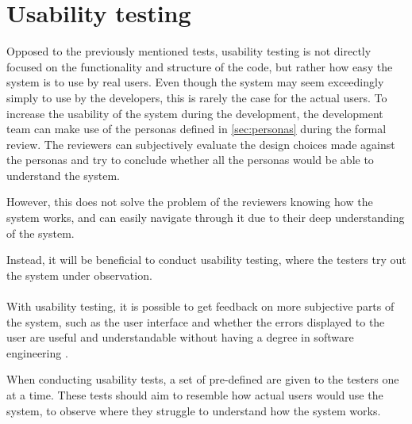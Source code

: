 \section{Usability testing}
Opposed to the previously mentioned tests, usability testing is not directly focused on the functionality and structure of the code, but rather how easy the system is to use by real users.
Even though the system may seem exceedingly simply to use by the developers, this is rarely the case for the actual users.
To increase the usability of the system during the development, the development team can make use of the personas defined in \autoref{sec:personas} during the formal review.
The reviewers can subjectively evaluate the design choices made against the personas and try to conclude whether all the personas would be able to understand the system.

However, this does not solve the problem of the reviewers knowing how the system works, and can easily navigate through it due to their deep understanding of the system.

Instead, it will be beneficial to conduct usability testing, where the testers try out the system under observation.
\\\\
With usability testing, it is possible to get feedback on more subjective parts of the system, such as the user interface and whether the errors displayed to the user are useful and understandable without having a degree in software engineering \cite{SoftwareTesting}.

When conducting usability tests, a set of pre-defined are given to the testers one at a time.
These tests should aim to resemble how actual users would use the system, to observe where they struggle to understand how the system works.
